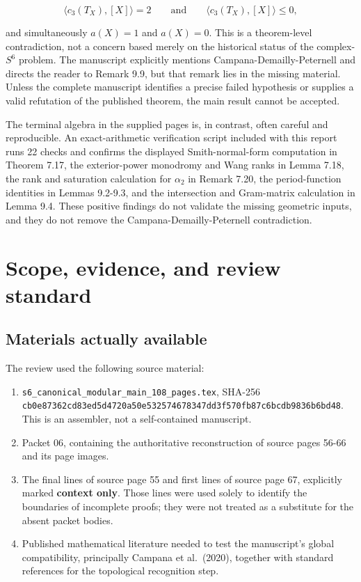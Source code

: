 \documentclass[
  10pt,
]{article}
\providecommand{\tightlist}{%
  \setlength{\itemsep}{0pt}\setlength{\parskip}{0pt}}
\begin{document}
\[
\langle c_3(T_X),[X]\rangle=2
\qquad\text{and}\qquad
\langle c_3(T_X),[X]\rangle\le 0,
\]

and simultaneously \(a(X)=1\) and \(a(X)=0\). This is a theorem-level
contradiction, not a concern based merely on the historical status of
the complex-\(S^6\) problem. The manuscript explicitly mentions
Campana-Demailly-Peternell and directs the reader to Remark 9.9, but
that remark lies in the missing material. Unless the complete manuscript
identifies a precise failed hypothesis or supplies a valid refutation of
the published theorem, the main result cannot be accepted.

The terminal algebra in the supplied pages is, in contrast, often
careful and reproducible. An exact-arithmetic verification script
included with this report runs 22 checks and confirms the displayed
Smith-normal-form computation in Theorem 7.17, the exterior-power
monodromy and Wang ranks in Lemma 7.18, the rank and saturation
calculation for \(\alpha_2\) in Remark 7.20, the period-function
identities in Lemmas 9.2-9.3, and the intersection and Gram-matrix
calculation in Lemma 9.4. These positive findings do not validate the
missing geometric inputs, and they do not remove the
Campana-Demailly-Peternell contradiction.

\section{Scope, evidence, and review
standard}\label{scope-evidence-and-review-standard}

\subsection{Materials actually
available}\label{materials-actually-available}

The review used the following source material:

\begin{enumerate}
\def\labelenumi{\arabic{enumi}.}
\tightlist
\item
  \texttt{s6\_canonical\_modular\_main\_108\_pages.tex}, SHA-256
  \texttt{cb0e87362cd83ed5d4720a50e532574678347dd3f570fb87c6bcdb9836b6bd48}.
  This is an assembler, not a self-contained manuscript.
\item
  Packet 06, containing the authoritative reconstruction of source pages
  56-66 and its page images.
\item
  The final lines of source page 55 and first lines of source page 67,
  explicitly marked \textbf{context only}. Those lines were used solely
  to identify the boundaries of incomplete proofs; they were not treated
  as a substitute for the absent packet bodies.
\item
  Published mathematical literature needed to test the manuscript's
  global compatibility, principally Campana et al.~(2020), together with
  standard references for the topological recognition step.
\end{enumerate}
\end{document}
